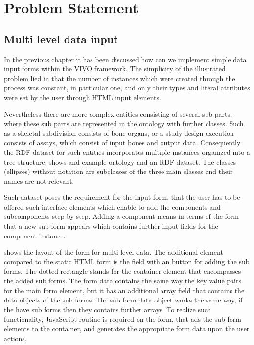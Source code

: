 \chapter{Problem Statement}


\section{Multi level data input}

In the previous chapter it has been discussed how can we implement simple data input forms within the VIVO framework. The simplicity of the illustrated problem lied in that the number of instances which were created through the process was constant, in particular one, and only their types and literal attributes were set by the user through HTML input elements. 


Nevertheless there are more complex entities consisting of several sub parts, where these sub parts are represented in the ontology with further classes. Such as a skeletal subdivision consists of bone organs, or a study design execution consists of assays, which consist of input bones and output data. Consequently the RDF dataset for such entities incorporates multiple instances organized into a tree structure.  shows and example ontology and an RDF dataset. The classes (ellipses) without notation are subclasses of the three main classes and their names are not relevant.

Such dataset poses the requirement for the input form, that the user has to be offered such interface elements which enable to add the components and subcomponents step by step. Adding a component means in terms of the form that a new sub form appears which contains further input fields for the component instance.


 shows the layout of the form for multi level data. The additional element compared to the static HTML form is the field with an button for adding the sub forms. The dotted rectangle stands for the container element that encompasses the added sub forms. The form data contains the same way the key value pairs for the main form element, but it has an additional array field that contains the data objects of the sub forms. The sub form data object works the same way, if the have sub forms then they contains further arrays. To realize such functionality, JavaScript routine is required on the form, that ads the sub form elements to the container, and generates the appropriate form data upon the user actions.

